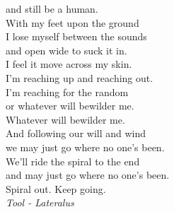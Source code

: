 \begin{flushright}
{and still be a human. \\
\vspace{0.2 cm}
With my feet upon the ground \\
I lose myself between the sounds \\
and open wide to suck it in. \\
I feel it move across my skin. \\
I'm reaching up and reaching out. \\
I'm reaching for the random \\
or whatever will bewilder me. \\
Whatever will bewilder me. \\
And following our will and wind \\
we may just go where no one's been. \\
We'll ride the spiral to the end \\
and may just go where no one's been. \\
\vspace{0.2 cm}
Spiral out. Keep going. \\
\vspace{0.2 cm}
\emph{Tool - Lateralus}
}
\end{flushright}

\newpage




%   

\newpage



